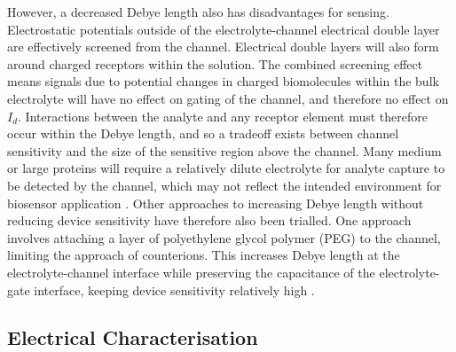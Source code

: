 \documentclass[
  a4paper,
]{scrbook}
\begin{document}
However, a decreased Debye length also has disadvantages for sensing.
Electrostatic potentials outside of the electrolyte-channel electrical
double layer are effectively screened from the channel. Electrical
double layers will also form around charged receptors within the
solution. The combined screening effect means signals due to potential
changes in charged biomolecules within the bulk electrolyte will have no
effect on gating of the channel, and therefore no effect on \(I_d\).
Interactions between the analyte and any receptor element must therefore
occur within the Debye length, and so a tradeoff exists between channel
sensitivity and the size of the sensitive region above the channel. Many
medium or large proteins will require a relatively dilute electrolyte
for analyte capture to be detected by the channel, which may not reflect
the intended environment for biosensor application
\autocite{Stern2007,Piccinini2018,Shkodra2021}. Other approaches to
increasing Debye length without reducing device sensitivity have
therefore also been trialled. One approach involves attaching a layer of
polyethylene glycol polymer (PEG) to the channel, limiting the approach
of counterions. This increases Debye length at the electrolyte-channel
interface while preserving the capacitance of the electrolyte-gate
interface, keeping device sensitivity relatively high
\autocite{Gao2016,Kesler2020,Albarghouthi2022}.

\hypertarget{electrical-characterisation}{%
\subsection{Electrical
Characterisation}\label{electrical-characterisation}}
\end{document}
